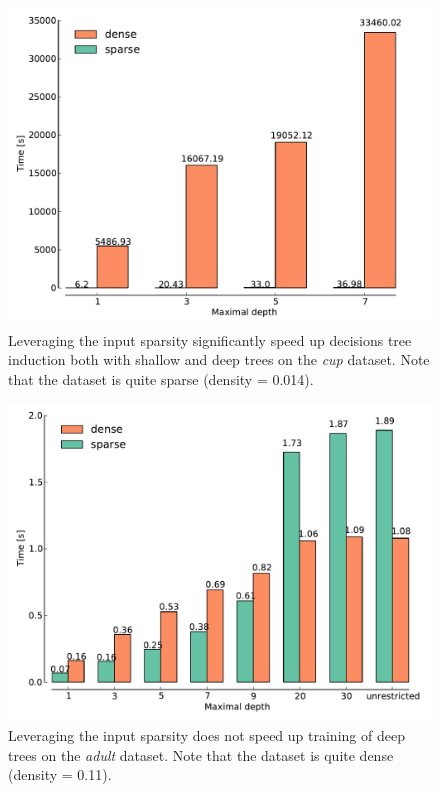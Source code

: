 \begin{figure}[h]
\centering
\includegraphics[scale=0.45]{images/cup.pdf}
\caption{Leveraging the input sparsity significantly speed up decisions
         tree induction both with shallow and deep trees on the \emph{cup}
         dataset. Note that the dataset is quite sparse (density = 0.014).}
\label{fig:cup}
\end{figure}


\begin{figure}[h]
\centering
\includegraphics[scale=0.45]{images/adult.pdf}
\caption{Leveraging the input sparsity does not speed up training of deep trees on the \emph{adult}
         dataset. Note that the dataset is quite dense (density = 0.11).}
\label{fig:adult}
\end{figure}


